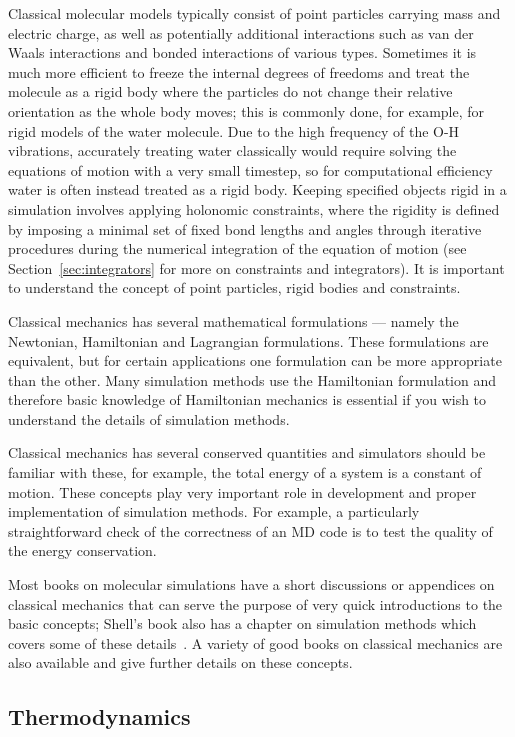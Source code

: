 \documentclass[9pt,bestpractices]{livecoms}
\begin{document}
Classical molecular models typically consist of point particles carrying mass and electric charge, as well as potentially additional interactions such as van der Waals interactions and bonded interactions of various types.
Sometimes it is much more efficient to freeze the internal degrees of freedoms and treat the molecule as a rigid body where the particles do not change their relative orientation as the whole body moves; this is commonly done, for example, for rigid models of the water molecule.
Due to the high frequency of the O-H vibrations, accurately treating water classically would require solving the equations of motion with a very small timestep, so for computational efficiency water is often instead treated as a rigid body.
Keeping specified objects rigid in a simulation involves applying holonomic constraints, where the rigidity is defined by imposing a minimal set of fixed bond lengths and angles through iterative procedures during the numerical integration of the equation of motion (see Section~\ref{sec:integrators} for more on constraints and integrators).
It is important to understand the concept of point particles, rigid bodies and constraints.

Classical mechanics has several mathematical formulations --- namely the Newtonian, Hamiltonian and Lagrangian formulations.
These formulations are equivalent, but for certain applications one formulation can be more appropriate than the other. 
Many simulation methods use the Hamiltonian formulation and therefore basic knowledge of Hamiltonian mechanics is essential if you wish to understand the details of simulation methods.

Classical mechanics has several conserved quantities and simulators should be familiar with these, for example, the total energy of a system is a constant of motion.
These concepts play very important role in development and proper implementation of simulation methods.
For example, a particularly straightforward check of the correctness of an MD code is to test the quality of the energy conservation.

Most books on molecular simulations have a short discussions or appendices on classical mechanics that can serve the purpose of very quick introductions to the basic concepts; Shell's book also has a chapter on simulation methods which covers some of these details~\cite{ShellBook}.
A variety of good books on classical mechanics are also available and give further details on these concepts.

\subsection{Thermodynamics}
\label{sec:thermodynamics}
\end{document}
